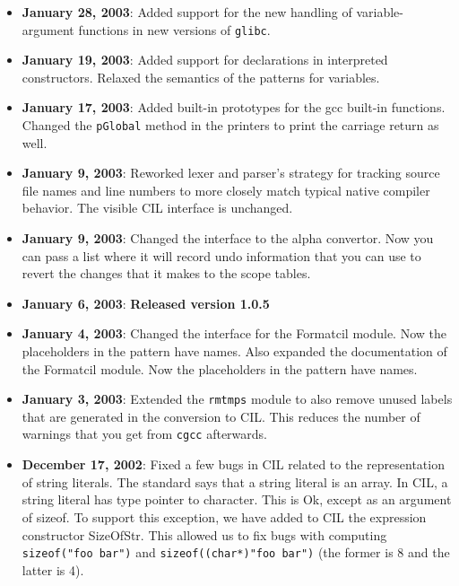 \documentclass[letterpaper]{article}
\def\t#1{{\tt #1}}
\begin{document}
\begin{itemize}
\item {\bf January 28, 2003}: Added support for the new handling of
variable-argument functions in new versions of \t{glibc}. 
\item {\bf January 19, 2003}: Added support for declarations in interpreted
  constructors. Relaxed the semantics of the patterns for variables. 
\item {\bf January 17, 2003}: Added built-in prototypes for the gcc built-in
  functions. Changed the \t{pGlobal} method in the printers to print the
  carriage return as well.
\item {\bf January 9, 2003}: Reworked lexer and parser's strategy for
  tracking source file names and line numbers to more closely match
  typical native compiler behavior.  The visible CIL interface is
  unchanged.
\item {\bf January 9, 2003}: Changed the interface to the alpha convertor. Now
you can pass a list where it will record undo information that you can use to
revert the changes that it makes to the scope tables.
\item {\bf January 6, 2003}: {\bf Released version 1.0.5}
\item {\bf January 4, 2003}: Changed the interface for the Formatcil module.
  Now the placeholders in the pattern have names. Also expanded the
  documentation of the Formatcil module.
  Now the placeholders in the pattern have names.
\item {\bf January 3, 2003}: Extended the \t{rmtmps} module to also remove
  unused labels that are generated in the conversion to CIL. This reduces the
  number of warnings that you get from \t{cgcc} afterwards.
\item {\bf December 17, 2002}: Fixed a few bugs in CIL related to the
  representation of string literals. The standard says that a string literal
  is an array. In CIL, a string literal has type pointer to character. This is
  Ok, except as an argument of sizeof. To support this exception, we have
  added to CIL the expression constructor SizeOfStr. This allowed us to fix
  bugs with computing \t{sizeof("foo bar")} and \t{sizeof((char*)"foo bar")}
  (the former is 8 and the latter is 4).


\end{itemize}
\end{document}
